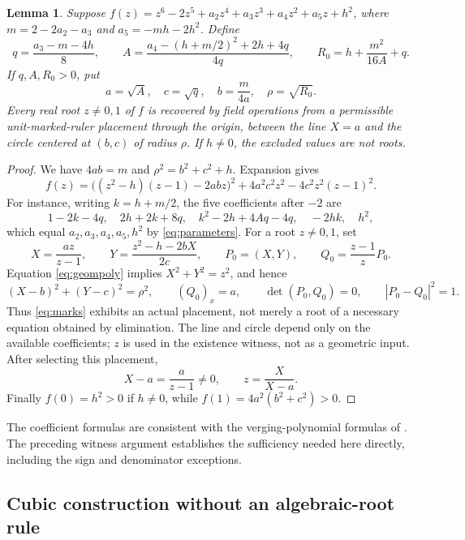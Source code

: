\documentclass[noproofs]{rmj-public}
\newtheorem{lemma}[thm]{Lemma}
\theoremstyle{definition}
\numberwithin{equation}{section}
\begin{document}
\begin{lemma}\label{lem:reconstruct}
Suppose
$f(z)=z^6-2z^5+a_2z^4+a_3z^3+a_4z^2+a_5z+h^2$,
where $m=2-2a_2-a_3$ and $a_5=-mh-2h^2$. Define
\begin{equation}\label{eq:parameters}
q=\frac{a_3-m-4h}{8},\qquad
A=\frac{a_4-(h+m/2)^2+2h+4q}{4q},\qquad
R_0=h+\frac{m^2}{16A}+q.
\end{equation}
If $q,A,R_0>0$, put
\[
a=\sqrt A,\quad c=\sqrt q,\quad b=\frac m{4a},\quad
\rho=\sqrt{R_0}.
\]
Every real root $z\ne0,1$ of $f$ is recovered by field operations from a
permissible unit-marked-ruler placement through the origin, between
the line $X=a$ and the circle centered at $(b,c)$ of radius $\rho$.
If $h\ne0$, the excluded values are not roots.
\end{lemma}
\begin{proof}
We have $4ab=m$ and $\rho^2=b^2+c^2+h$. Expansion gives
\begin{equation}\label{eq:geompoly}
f(z)=\big((z^2-h)(z-1)-2abz\big)^2
+4a^2c^2z^2-4c^2z^2(z-1)^2.
\end{equation}
For instance, writing $k=h+m/2$, the five coefficients after $-2$ are
\[
1-2k-4q,\quad 2h+2k+8q,\quad
k^2-2h+4Aq-4q,\quad -2hk,\quad h^2,
\]
which equal $a_2,a_3,a_4,a_5,h^2$ by \eqref{eq:parameters}.
For a root $z\ne0,1$, set
\begin{equation}\label{eq:marks}
X=\frac{az}{z-1},\qquad
Y=\frac{z^2-h-2bX}{2c},\qquad P_0=(X,Y),\qquad
Q_0=\frac{z-1}{z}P_0.
\end{equation}
Equation \eqref{eq:geompoly} implies $X^2+Y^2=z^2$, and hence
\[
(X-b)^2+(Y-c)^2=\rho^2,\qquad
(Q_0)_x=a,\qquad \det(P_0,Q_0)=0,\qquad
|P_0-Q_0|^2=1.
\]
Thus \eqref{eq:marks} exhibits an actual placement, not merely a root of
a necessary equation obtained by elimination. The line and circle depend
only on the available coefficients; $z$ is used in the existence witness,
not as a geometric input. After selecting this placement,
\[
X-a=\frac a{z-1}\ne0,\qquad z=\frac X{X-a}.
\]
Finally $f(0)=h^2>0$ if $h\ne0$, while
$f(1)=4a^2(b^2+c^2)>0$.
\end{proof}

The coefficient formulas are consistent with the verging-polynomial
formulas of \cite[Theorem 3.1]{BS16}. The preceding witness argument
establishes the sufficiency needed here directly, including the sign and
denominator exceptions.

\subsection{Cubic construction without an algebraic-root rule}
\end{document}
